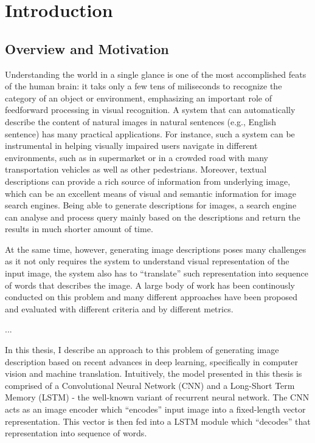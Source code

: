 \chapter{Introduction}

\section{Overview and Motivation}
Understanding the world in a single glance is one of the most accomplished feats of the human brain: it taks only a few tens of miliseconds to recognize the category of an object or environment, emphasizing an important role of feedforward processing in visual recognition.
A system that can automatically describe the content of natural images in natural sentences (e.g., English sentence) has many practical applications. For instance, such a system can be instrumental in helping visually impaired users navigate in different environments, such as in supermarket or in a crowded road with many transportation vehicles as well as other pedestrians. Moreover, textual descriptions can provide a rich source of information from underlying image, which can be an excellent means of visual and semantic information for image search engines. Being able to generate descriptions for images, a search engine can analyse and process query mainly based on the descriptions and return the results in much shorter amount of time.

At the same time, however, generating image descriptions poses many challenges as it not only requires the system to understand visual representation of the input image, the system also has to ``translate'' such representation into sequence of words that describes the image. A large body of work has been continously conducted on this problem and many different approaches have been proposed and evaluated with different criteria and by different metrics.

...

In this thesis, I describe an approach to this problem of generating image description based on recent advances in deep learning, specifically in computer vision and machine translation. Intuitively, the model presented in this thesis is comprised of a Convolutional Neural Network (CNN) and a Long-Short Term Memory (LSTM) - the well-known variant of recurrent neural network. The CNN acts as an image encoder which ``encodes'' input image into a fixed-length vector representation. This vector is then fed into a LSTM module which ``decodes'' that representation into sequence of words.

